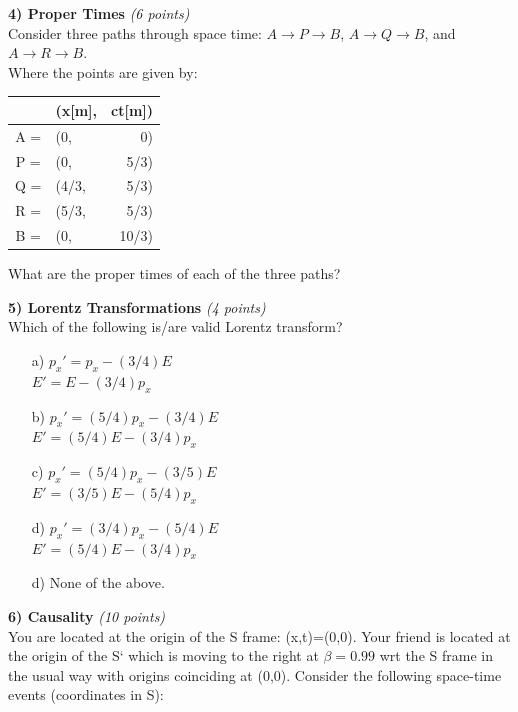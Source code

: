{\clearpage

\textbf{4) Proper Times}  \hfill \textit{(6 points)}\\
Consider three paths through space time: $A\rightarrow P \rightarrow B$, $A\rightarrow Q \rightarrow B$, and $A\rightarrow R \rightarrow B$.\\
Where the points are given by:

\begin{tabular}{clr}
  & (x[m],& ct[m])\\
  \hline
  A = & (0, & 0)\\
  P = & (0, & 5/3)\\
  Q = & (4/3, & 5/3)\\
  R = & (5/3, & 5/3)\\
  B = & (0,    & 10/3)\\
\end{tabular}

What are the proper times of each of the three paths?

\vfill

\textbf{5) Lorentz Transformations}  \hfill \textit{(4 points)}\\
Which of the following is/are valid Lorentz transform?
\begin{itemize}
\item[a)] $p_x' = p_x - (3/4) E$ \\ $E' = E - (3/4) p_x$ \\
\item[b)] $p_x' = (5/4)p_x - (3/4) E$ \\ $E' = (5/4)E - (3/4) p_x$ \\
\item[c)] $p_x' = (5/4)p_x - (3/5) E$ \\ $E' = (3/5)E - (5/4) p_x$ \\
\item[d)] $p_x' = (3/4)p_x - (5/4) E$ \\ $E' = (5/4)E - (3/4) p_x$ \\
\item[d)] None of the above.
\end{itemize}

\clearpage


\textbf{6) Causality}  \hfill \textit{(10 points)}\\
You are located at the origin of the S frame: (x,t)=(0,0).
Your friend is located at the origin of the S` which is moving to the right at $\beta = 0.99$ wrt the S frame in the usual way with origins coinciding at (0,0).
Consider the following space-time events (coordinates in S):\\

}
